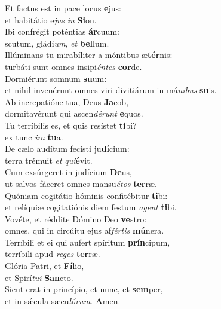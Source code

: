 \evenverse Et factus est in pace locus \textbf{e}jus:~\*\\
\evenverse et habitátio e\textit{jus} \textit{in} \textbf{Si}on.\\
\oddverse Ibi confrégit poténtias \textbf{ár}cuum:~\*\\
\oddverse scutum, gládi\textit{um}, \textit{et} \textbf{bel}lum.\\
\evenverse Illúminans tu mirabíliter a móntibus æ\textbf{tér}nis:~\*\\
\evenverse turbáti sunt omnes insipi\textit{én}\textit{tes} \textbf{cor}de.\\
\oddverse Dormiérunt somnum \textbf{su}um:~\*\\
\oddverse et nihil invenérunt omnes viri divitiárum in má\textit{ni}\textit{bus} \textbf{su}is.\\
\evenverse Ab increpatióne tua, Deus \textbf{Ja}cob,~\*\\
\evenverse dormitavérunt qui ascen\textit{dé}\textit{runt} \textbf{e}quos.\\
\oddverse Tu terríbilis es, et quis resístet \textbf{ti}bi?~\*\\
\oddverse ex tunc \textit{i}\textit{ra} \textbf{tu}a.\\
\evenverse De cælo audítum fecísti ju\textbf{dí}cium:~\*\\
\evenverse terra trémuit \textit{et} \textit{qui}\textbf{é}vit.\\
\oddverse Cum exsúrgeret in judícium \textbf{De}us,~\*\\
\oddverse ut salvos fáceret omnes mansu\textit{é}\textit{tos} \textbf{ter}ræ.\\
\evenverse Quóniam cogitátio hóminis confitébitur \textbf{ti}bi:~\*\\
\evenverse et relíquiæ cogitatiónis diem festum \textit{a}\textit{gent} \textbf{ti}bi.\\
\oddverse Vovéte, et réddite Dómino Deo \textbf{ve}stro:~\*\\
\oddverse omnes, qui in circúitu ejus af\textit{fér}\textit{tis} \textbf{mú}nera.\\
\evenverse Terríbili et ei qui aufert spíritum \textbf{prín}cipum,~\*\\
\evenverse terríbili apud \textit{re}\textit{ges} \textbf{ter}ræ.\\
\oddverse Glória Patri, et \textbf{Fí}lio,~\*\\
\oddverse et Spirí\textit{tu}\textit{i} \textbf{San}cto.\\
\evenverse Sicut erat in princípio, et nunc, et \textbf{sem}per,~\*\\
\evenverse et in sǽcula sæcu\textit{ló}\textit{rum}. \textbf{A}men.\\
